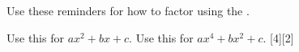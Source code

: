 \documentclass[12pt,letterpaper]{memoir}
\begin{document}
\pagestyle{plain}
\checkandfixthelayout
\raggedbottom


\noindent
{
    \Large
    Use these reminders for how to factor using the 
    .
}

\vfill

\myProblemsWithContent
{
    Use this for {\Large $ax^2 + bx + c$.}
    \tcblower
}
{
    Use this for {\Large $ax^4 + bx^2 + c$.}
    \tcblower
    [4][2]
}

\vfill


\vfill
\end{document}
